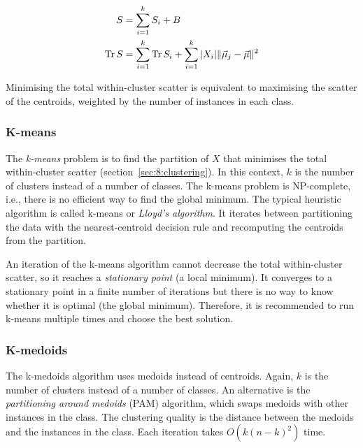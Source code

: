 \begin{thm}
  \begin{align}
    S
     & = \sum_{i = 1}^{k} S_i + B
    \\
    \operatorname{Tr} S
     & = \sum_{i = 1}^{k} \operatorname{Tr} S_i +
    \sum_{i = 1}^{k} |X_i| \lVert \vec{\mu}_j - \vec{\mu} \rVert^2
  \end{align}
\end{thm}

Minimising the total within-cluster scatter is equivalent to maximising the
scatter of the centroids, weighted by the number of instances in each class.

\subsubsection{K-means}

The \textit{k-means} problem is to find the partition of $X$ that minimises the
total within-cluster scatter (section~\ref{sec:8:clustering}).
In this context, $k$ is the number of clusters instead of a number of classes.
The k-means problem is NP-complete, i.e., there is no efficient way to find the
global minimum.
The typical heuristic algorithm is called k-means or \textit{Lloyd's
  algorithm}.
It iterates between partitioning the data with the nearest-centroid decision
rule and recomputing the centroids from the partition.

An iteration of the k-means algorithm cannot decrease the total within-cluster
scatter, so it reaches a \textit{stationary point} (a local minimum).
It converges to a stationary point in a finite number of iterations but there
is no way to know whether it is optimal (the global minimum).
Therefore, it is recommended to run k-means multiple times and choose the best
solution.

\subsubsection{K-medoids}

The k-medoids algorithm uses medoids instead of centroids.
Again, $k$ is the number of clusters instead of a number of classes.
An alternative is the \textit{partitioning around medoids} (PAM) algorithm,
which swaps medoids with other instances in the class.
The clustering quality is the distance between the medoids and the instances in
the class.
Each iteration takes $O(k(n - k)^2)$ time.

